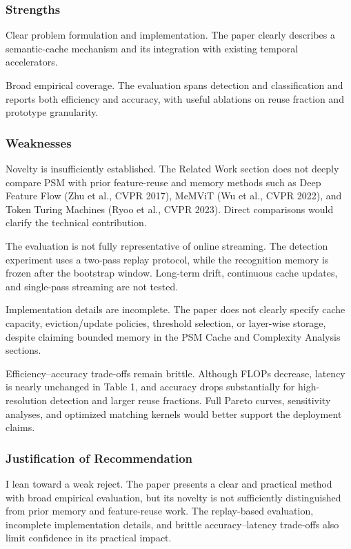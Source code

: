 \documentclass[11pt]{article}
\begin{document}
\subsubsection*{Strengths}
Clear problem formulation and implementation. The paper clearly describes a semantic-cache mechanism and its integration with existing temporal accelerators.

Broad empirical coverage. The evaluation spans detection and classification and reports both efficiency and accuracy, with useful ablations on reuse fraction and prototype granularity.

\subsubsection*{Weaknesses}
Novelty is insufficiently established. The Related Work section does not deeply compare PSM with prior feature-reuse and memory methods such as Deep Feature Flow (Zhu et al., CVPR 2017), MeMViT (Wu et al., CVPR 2022), and Token Turing Machines (Ryoo et al., CVPR 2023). Direct comparisons would clarify the technical contribution.

The evaluation is not fully representative of online streaming. The detection experiment uses a two-pass replay protocol, while the recognition memory is frozen after the bootstrap window. Long-term drift, continuous cache updates, and single-pass streaming are not tested.

Implementation details are incomplete. The paper does not clearly specify cache capacity, eviction/update policies, threshold selection, or layer-wise storage, despite claiming bounded memory in the PSM Cache and Complexity Analysis sections.

Efficiency--accuracy trade-offs remain brittle. Although FLOPs decrease, latency is nearly unchanged in Table 1, and accuracy drops substantially for high-resolution detection and larger reuse fractions. Full Pareto curves, sensitivity analyses, and optimized matching kernels would better support the deployment claims.

\subsubsection*{Justification of Recommendation}
I lean toward a weak reject. The paper presents a clear and practical method with broad empirical evaluation, but its novelty is not sufficiently distinguished from prior memory and feature-reuse work. The replay-based evaluation, incomplete implementation details, and brittle accuracy--latency trade-offs also limit confidence in its practical impact.
\end{document}
